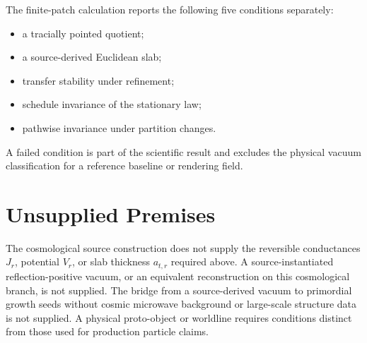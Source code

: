 \documentclass[11pt]{article}
\theoremstyle{remark}
\theoremstyle{plain}
\begin{document}
The finite-patch calculation reports the following five conditions separately:
\begin{itemize}[leftmargin=2em]
\item a tracially pointed quotient;
\item a source-derived Euclidean slab;
\item transfer stability under refinement;
\item schedule invariance of the stationary law;
\item pathwise invariance under partition changes.
\end{itemize}
A failed condition is part of the scientific result and excludes the physical
vacuum classification for a reference baseline or rendering field.

\section{Unsupplied Premises}

The cosmological source construction does not supply the reversible
conductances \(J_r\), potential \(V_r\), or slab thickness \(a_{t,r}\)
required above. A source-instantiated reflection-positive vacuum, or an
equivalent reconstruction on this cosmological branch, is not supplied.
The bridge from a source-derived vacuum to primordial growth seeds
without cosmic microwave background or large-scale structure data is not
supplied. A physical proto-object or worldline requires conditions distinct
from those used for production particle claims.
\end{document}
